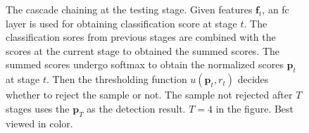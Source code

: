 \documentclass[10pt,twocolumn,letterpaper]{article}
\begin{document}
\begin{figure}
\begin{center}
\centerline{}
\end{center}
\vspace{-10pt}
   \caption{The cascade chaining at the testing stage. Given features $\mathbf{f}_t$, an fc layer is used for obtaining classification score at stage $t$. The classification sores from previous stages are combined with the scores at the current stage to obtained the summed scores. The summed scores undergo softmax to obtain the normalized scores $\mathbf{p}_t$ at stage $t$. Then the thresholding function $u(\mathbf{p}_t, r_t)$ decides whether to reject the sample or not. The sample not rejected after $T$ stages uses the $\mathbf{p}_T$ as the detection result. $T=4$ in the figure. Best viewed in color.}
\label{fig:testSC}
\end{figure}

\begin{table*}[t]
\end{table*}
\end{document}

